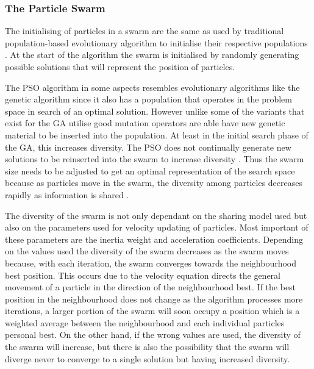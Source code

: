\subsubsection{The Particle Swarm}
The initialising of particles in a swarm are the same as used by traditional population-based evolutionary algorithm to initialise their respective populations \cite{FixedFAPPSO}.  At the start of the algorithm the swarm is initialised by randomly generating possible solutions that will represent the position of particles\cite{CompuIntelligenceIntro}. 

The \gls{PSO} algorithm in some aspects resembles evolutionary algorithms like the genetic algorithm since it also has a population that operates in the problem space in search of an optimal solution. However unlike some of the variants that exist for the \gls{GA} utilise good mutation operators are able have new genetic material to be inserted into the population. At least in the initial search phase of the GA, this increases diversity\cite{CompuIntelligenceIntro}. The \gls{PSO} does not continually generate new solutions to be reinserted into the swarm to increase diversity \cite{PSOHybridUnitCommit}. Thus the swarm size needs to be adjusted to get an optimal representation of the search space because as particles move in the swarm, the diversity among particles decreases rapidly as information is shared \cite{FundamentalSwarm,CompuIntelligenceIntro}. 

The diversity of the swarm is not only dependant on the sharing model used but also on the parameters used for velocity updating of particles. Most important of these parameters are the inertia weight and acceleration coefficients. Depending on the values used the diversity of the swarm decreases as the swarm moves because, with each iteration, the swarm converges towards the neighbourhood best position\cite{PSOHybridJobShop,CompuIntelligenceIntro,FundamentalSwarm}. This occurs due to the velocity equation directs the general movement of a particle in the direction of the neighbourhood best\cite{PSOHybridJobShop,CompuIntelligenceIntro,FundamentalSwarm}. If the best position in the neighbourhood does not change as the algorithm processes more iterations, a larger portion of the swarm will soon occupy a position which is a weighted average between the neighbourhood and each individual particles personal best\cite{PSOHybridJobShop,CompuIntelligenceIntro,FundamentalSwarm}. On the other hand, if the wrong values are used, the diversity of the swarm will increase, but there is also the possibility that the swarm will diverge never to converge to a single solution but having increased diversity\cite{FundamentalSwarm}.

